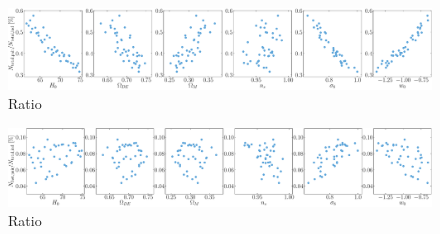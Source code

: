 \documentclass[onecolumn]{aastex62}
\begin{document}
\begin{figure}
\begin{center}
  \includegraphics[width=1.0\textwidth]{ratio_pair_total_ind_total.pdf}
\end{center}
\caption{Ratio}
\label{fig:ratio_total}
\end{figure}

\begin{figure}
\begin{center}
  \includegraphics[width=1.0\textwidth]{ratio_pair_high_ind_total.pdf}
\end{center}
\caption{Ratio}
\label{fig:ratio_fast}
\end{figure}
\end{document}
